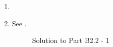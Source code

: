\documentclass{report}
\begin{document}
\begin{enumerate}
\item
\item See .

\begin{figure}[p]
    \vspace*{-2cm}
    \caption{Solution to Part B2.2 - 1}
    \label{fig:b22-1}
\end{figure}


\end{enumerate}
\end{document}
